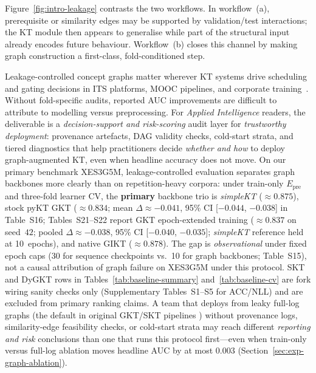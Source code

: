 \documentclass[pdflatex,sn-mathphys-num]{sn-jnl}
\newcommand{\Epre}{\ensuremath{E_{\text{pre}}}}
\newcommand{\GKTdeltaci}{[$-0.044$, $-0.038$]}
\newcommand{\GKTthirtydeltavec}{-0.038}
\newcommand{\GKTthirtydeltaci}{[$-0.040$, $-0.035$]}
\begin{document}
Figure~\ref{fig:intro-leakage} contrasts the two workflows. In
workflow~(a), prerequisite or similarity edges may be supported by
validation/test interactions; the KT module then appears to generalise
while part of the structural input already encodes future behaviour.
Workflow~(b) closes this channel by making graph construction a
first-class, fold-conditioned step.

Leakage-controlled concept graphs matter wherever KT systems drive
scheduling and gating decisions in ITS platforms, MOOC pipelines, and
corporate training~\cite{heffernan2006assist,junyi_dataset,choi2020ednet,xes3g5m2023}.
Without fold-specific audits, reported AUC improvements are difficult to
attribute to modelling versus preprocessing. For \textit{Applied
Intelligence} readers, the deliverable is a \emph{decision-support and
risk-scoring} audit layer for \emph{trustworthy deployment}: provenance
artefacts, DAG validity checks, cold-start strata, and tiered diagnostics that
help practitioners decide \emph{whether and how} to deploy graph-augmented KT,
even when headline accuracy does not move. On our primary benchmark XES3G5M, leakage-controlled
evaluation separates graph backbones more clearly than on repetition-heavy
corpora: under train-only $\Epre$ and three-fold learner CV, the
\textbf{primary} backbone trio is \textit{simpleKT} (${\approx}0.875$),
stock pyKT GKT (${\approx}0.834$; mean $\Delta{\approx}{-}0.041$, 95\% CI
\GKTdeltaci{} in Table~S16; Tables~S21--S22 report GKT epoch-extended training
(${\approx}0.837$ on seed~$42$; pooled $\Delta{\approx}\GKTthirtydeltavec{}$,
95\% CI \GKTthirtydeltaci{}; \textit{simpleKT} reference held at 10~epochs),
and native GIKT (${\approx}0.878$). The gap is
\emph{observational} under fixed epoch caps (30 for sequence checkpoints
vs.\ 10 for graph backbones; Table~S15), not a causal attribution of graph
failure on XES3G5M under this protocol. SKT and DyGKT rows in
Tables~\ref{tab:baseline-summary} and~\ref{tab:baseline-cv} are fork wiring
sanity checks only (Supplementary Tables~S1--S5 for ACC/NLL) and are excluded
from primary ranking claims. A team that
deploys from leaky full-log graphs (the default in original GKT/SKT pipelines
\cite{nakagawa2019gkt,tong2020skt}) without provenance logs, similarity-edge
feasibility checks, or cold-start strata may reach different \emph{reporting
and risk} conclusions than one that runs this protocol first---even when
train-only versus full-log ablation moves headline AUC by at most $0.003$
(Section~\ref{sec:exp-graph-ablation}).
\end{document}

